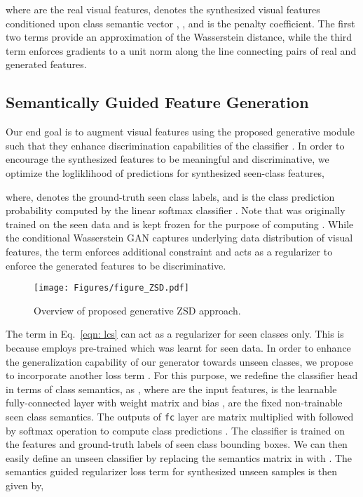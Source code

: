 \documentclass[runningheads]{llncs}
\begin{document}
\noindent where  are the real visual features,  denotes the synthesized visual features conditioned upon class semantic vector , ,  and  is the penalty coefficient. The first two terms provide an approximation of the Wasserstein distance, while the third term enforces gradients to a unit norm along the line connecting pairs of real and generated features. 


\subsection{Semantically Guided Feature Generation}
Our end goal is to augment visual features using the proposed generative module such that they enhance discrimination capabilities of the classifier . In order to encourage the synthesized features  to be meaningful and discriminative, we optimize the logliklihood of predictions for synthesized seen-class features,

where,  denotes the ground-truth seen class labels, and  is the class prediction probability computed by the linear softmax classifier . Note that  was originally trained on the seen data  and is kept frozen for the purpose of computing . While the conditional Wasserstein GAN captures underlying data distribution of visual features, the  term enforces additional constraint and acts as a regularizer to enforce the generated features to be discriminative.

\begin{figure}[tp]
    \centering
    \texttt{[image: Figures/figure\_ZSD.pdf]}
    \caption{Overview of proposed generative ZSD approach.}
    \label{fig:main_fig}
\end{figure}


The  term in Eq.~\ref{eqn: lcs} can act as a regularizer for seen classes only. This is because  employs pre-trained  which was learnt for seen data. In order to enhance the generalization capability of our generator  towards unseen classes, we propose to incorporate another loss term .
For this purpose, we redefine the classifier head in terms of class semantics, as , where  are the input features,  is the learnable fully-connected layer with weight matrix  and bias ,  are the fixed non-trainable seen class semantics. The outputs of \texttt{fc} layer are matrix multiplied with  followed by softmax operation to compute class predictions . The classifier  is trained on the features  and ground-truth labels  of seen class bounding boxes. We can then easily define an unseen classifier  by replacing the semantics matrix  in   with .
The semantics guided regularizer loss term  for synthesized unseen samples is then given by,
\end{document}
